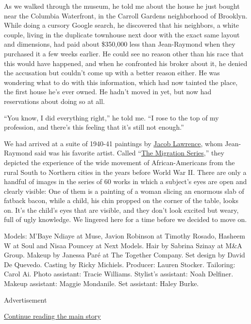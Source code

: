 As we walked through the museum, he told me about the house he just
bought near the Columbia Waterfront, in the Carroll Gardens neighborhood
of Brooklyn. While doing a cursory Google search, he discovered that his
neighbors, a white couple, living in the duplicate townhouse next door
with the exact same layout and dimensions, had paid about \$350,000 less
than Jean-Raymond when they purchased it a few weeks earlier. He could
see no reason other than his race that this would have happened, and
when he confronted his broker about it, he denied the accusation but
couldn't come up with a better reason either. He was wondering what to
do with this information, which had now tainted the place, the first
house he's ever owned. He hadn't moved in yet, but now had reservations
about doing so at all.

``You know, I did everything right,'' he told me. ``I rose to the top of
my profession, and there's this feeling that it's still not enough.''

We had arrived at a suite of 1940-41 paintings by
\href{https://www.nytimes3xbfgragh.onion/2000/06/10/arts/jacob-lawrence-dead-82-vivid-painter-who-chronicled-odyssey-black-americans.html}{Jacob
Lawrence}, whom Jean-Raymond said was his favorite artist. Called
``\href{https://www.moma.org/calendar/exhibitions/444}{The Migration
Series},'' they depicted the experience of the wide movement of
African-Americans from the rural South to Northern cities in the years
before World War II. There are only a handful of images in the series of
60 works in which a subject's eyes are open and clearly visible: One of
them is a painting of a woman slicing an enormous slab of fatback bacon,
while a child, his chin propped on the corner of the table, looks on.
It's the child's eyes that are visible, and they don't look excited but
weary, full of ugly knowledge. We lingered here for a time before we
decided to move on.

Models: M'Baye Ndiaye at Muse, Javion Robinson at Timothy Rosado,
Hasheem W at Soul and Nisaa Pouncey at Next Models. Hair by Sabrina
Szinay at M\&A Group. Makeup by Janessa Paré at The Together Company.
Set design by David De Quevedo. Casting by Ricky Michiels. Producer:
Lauren Stocker. Tailoring: Carol Ai. Photo assistant: Tracie Williams.
Stylist's assistant: Noah Delfiner. Makeup assistant: Maggie Mondanile.
Set assistant: Haley Burke.

Advertisement

\protect\hyperlink{after-bottom}{Continue reading the main story}

